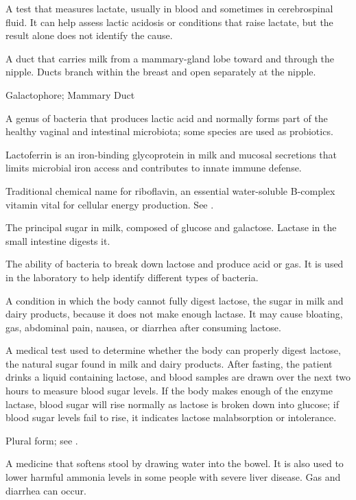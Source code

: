  A test that measures lactate, usually in blood and sometimes in cerebrospinal fluid. It can help assess lactic acidosis or conditions that raise lactate, but the result alone does not identify the cause.

 A duct that carries milk from a mammary-gland lobe toward and through the nipple. Ducts branch within the breast and open separately at the nipple.

\synonyms
Galactophore; Mammary Duct

 A genus of bacteria that produces lactic acid and normally forms part of the healthy vaginal and intestinal microbiota; some species are used as probiotics.

 Lactoferrin is an iron-binding glycoprotein in milk and mucosal secretions that limits microbial iron access and contributes to innate immune defense.

 Traditional chemical name for riboflavin, an essential water-soluble B-complex vitamin vital for cellular energy production. See .

 The principal sugar in milk, composed of glucose and galactose. Lactase in the small intestine digests it.

 The ability of bacteria to break down lactose and produce acid or gas. It is used in the laboratory to help identify different types of bacteria.

 A condition in which the body cannot fully digest lactose, the sugar in milk and dairy products, because it does not make enough lactase. It may cause bloating, gas, abdominal pain, nausea, or diarrhea after consuming lactose.

 A medical test used to determine whether the body can properly digest lactose, the natural sugar found in milk and dairy products. After fasting, the patient drinks a liquid containing lactose, and blood samples are drawn over the next two hours to measure blood sugar levels. If the body makes enough of the enzyme lactase, blood sugar will rise normally as lactose is broken down into glucose; if blood sugar levels fail to rise, it indicates lactose malabsorption or intolerance.

 Plural form; see .

 A medicine that softens stool by drawing water into the bowel. It is also used to lower harmful ammonia levels in some people with severe liver disease. Gas and diarrhea can occur.

